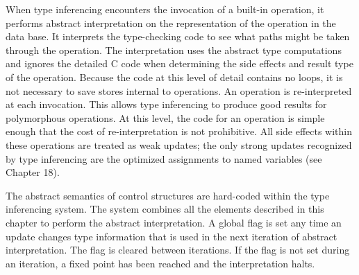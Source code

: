 When type inferencing encounters the invocation of a built-in
operation, it performs abstract interpretation on the representation
of the operation in the data base. It interprets the type-checking
code to see what paths might be taken through the operation. The
interpretation uses the abstract type computations and ignores the
detailed C code when determining the side effects and result type of
the operation. Because the code at this level of detail contains no
loops, it is not necessary to save stores internal to operations. An
operation is re-interpreted at each invocation.  This allows type
inferencing to produce good results for polymorphous operations. At
this level, the code for an operation is simple enough that the cost
of re-interpretation is not prohibitive. All side effects within these
operations are treated as weak updates; the only strong updates
recognized by type inferencing are the optimized assignments to named
variables (see Chapter 18).

The abstract semantics of control structures are hard-coded within the
type inferencing system. The system combines all the elements
described in this chapter to perform the abstract interpretation. A
global flag is set any time an update changes type information that is
used in the next iteration of abstract interpretation. The flag is
cleared between iterations. If the flag is not set during an
iteration, a fixed point has been reached and the interpretation
halts.
